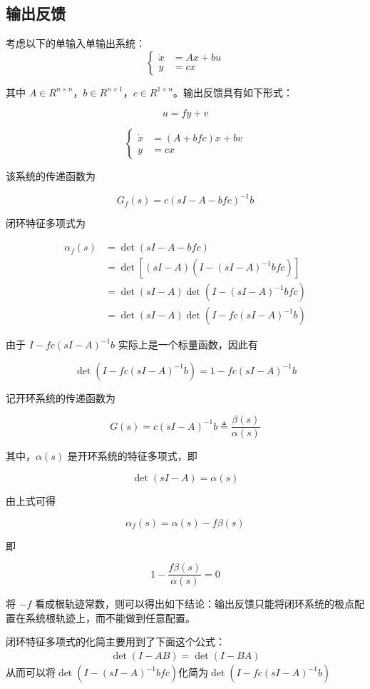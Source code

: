 \subsection{输出反馈}

考虑以下的单输入单输出系统：
\[
\left\{
\begin{aligned}
\dot{x} &= Ax+bu\\
y &= cx
\end{aligned}
\right.
\]

其中 $A\in R^{n\times n}$，$b\in R^{n\times 1}$，$c\in R^{1\times n}$。输出反馈具有如下形式：

\[
u=fy+v
\]

\[
\left\{
\begin{aligned}
\dot{x} &= (A+bfc)x+bv\\
y &= cx
\end{aligned}
\right.
\]

该系统的传递函数为

\[
G_f(s)=c(sI-A-bfc)^{-1}b
\]

闭环特征多项式为

\[
\begin{aligned}
\alpha_f(s)
&=\det(sI-A-bfc)\\
&=\det\left[(sI-A)\left(I-(sI-A)^{-1}bfc\right)\right]\\
&=\det(sI-A)\det\left(I-(sI-A)^{-1}bfc\right)\\
&=\det(sI-A)\det\left(I-fc(sI-A)^{-1}b\right)
\end{aligned}
\]

由于 $I-fc(sI-A)^{-1}b$ 实际上是一个标量函数，因此有

\[
\det\left(I-fc(sI-A)^{-1}b\right)
=1-fc(sI-A)^{-1}b
\]

记开环系统的传递函数为

\[
G(s)=c(sI-A)^{-1}b \triangleq \frac{\beta(s)}{\alpha(s)}
\]

其中，$\alpha(s)$ 是开环系统的特征多项式，即

\[
\det(sI-A)=\alpha(s)
\]

由上式可得

\[
\alpha_f(s)=\alpha(s)-f\beta(s)
\]

即

\[
1-\frac{f\beta(s)}{\alpha(s)}=0
\]

将 $-f$ 看成根轨迹常数，则可以得出如下结论：输出反馈只能将闭环系统的极点配置在系统根轨迹上，而不能做到任意配置。
\begin{marker}
    闭环特征多项式的化简主要用到了下面这个公式：
    \begin{align*}
        \det(I-AB) = \det(I - BA)
    \end{align*}
    从而可以将$\det(I - (sI - A)^{-1} b f c)$化简为$\det(I - f c (sI - A)^{-1} b)$
\end{marker}

